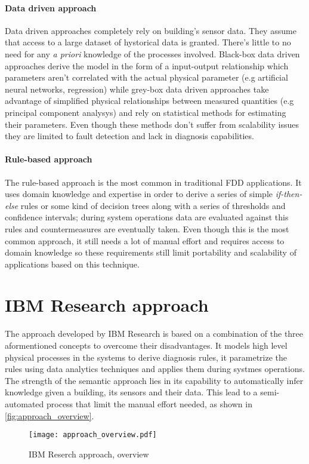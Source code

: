 \paragraph{Data driven approach} \label{subsec:data_models}
Data driven approaches completely rely on building's sensor data. They assume that access to a large dataset of hystorical data is granted. There's little to no need for any \textit{a priori} knowledge of the processes involved. Black-box data driven approaches derive the model in the form of a input-output relationship which parameters aren't correlated with the actual physical parameter (e.g artificial neural networks, regression) while grey-box data driven approaches take advantage of simplified physical relationships between measured quantities (e.g principal component analysys) and rely on statistical methods for estimating their parameters. Even though these methods don't suffer from scalability issues they are limited to fault detection and lack in diagnosis capabilities.

\paragraph{Rule-based approach} \label{subsec:rule_models}
The rule-based approach is the most common in traditional FDD applications. It uses domain knowledge and expertise in order to derive a series of simple \textit{if-then-else} rules or some kind of decision trees along with a series of thresholds and confidence intervals; during system operations data are evaluated against this rules and countermeasures are eventually taken. Even though this is the most common approach, it still needs a lot of manual effort and requires access to domain knowledge so these requirements still limit portability and scalability of applications based on this technique.

\section{IBM Research approach}
The approach developed by IBM Research is based on a combination of the three aformentioned concepts to overcome their disadvantages. It models high level physical processes in the systems to derive diagnosis rules, it parametrize the rules using data analytics techniques and applies them during systmes operations. The strength of the semantic approach lies in its capability to automatically infer knowledge given a building, its sensors and their data. This lead to a semi-automated process that limit the manual effort needed, as shown in \autoref{fig:approach_overview}.
\begin{figure}
  \centering
  \texttt{[image: approach\_overview.pdf]}
  \caption{IBM Reserch approach, overview}
  \label{fig:approach_overview}
\end{figure}

